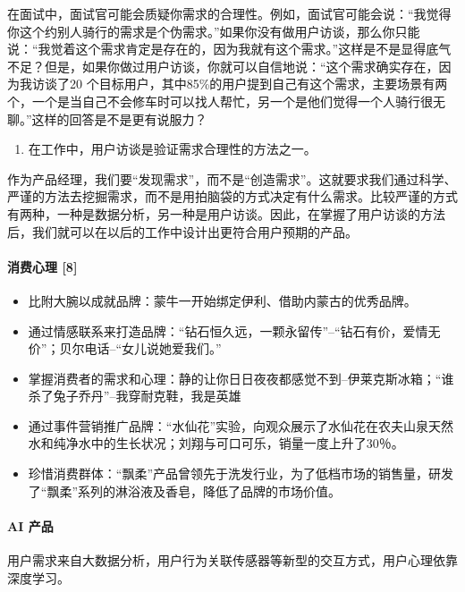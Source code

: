 \documentclass[letterpaper,10pt,english]{sphinxmanual}
\begin{document}
在面试中，面试官可能会质疑你需求的合理性。例如，面试官可能会说：“我觉得你这个约别人骑行的需求是个伪需求。”如果你没有做用户访谈，那么你只能说：“我觉着这个需求肯定是存在的，因为我就有这个需求。”这样是不是显得底气不足？但是，如果你做过用户访谈，你就可以自信地说：“这个需求确实存在，因为我访谈了20
个目标用户，其中85\%的用户提到自己有这个需求，主要场景有两个，一个是当自己不会修车时可以找人帮忙，另一个是他们觉得一个人骑行很无聊。”这样的回答是不是更有说服力？
\begin{enumerate}
%
\setcounter{enumi}{1}
\item {} 
在工作中，用户访谈是验证需求合理性的方法之一。

\end{enumerate}

作为产品经理，我们要“发现需求”，而不是“创造需求”。这就要求我们通过科学、严谨的方法去挖掘需求，而不是用拍脑袋的方式决定有什么需求。比较严谨的方式有两种，一种是数据分析，另一种是用户访谈。因此，在掌握了用户访谈的方法后，我们就可以在以后的工作中设计出更符合用户预期的产品。


\paragraph{消费心理 {[}8{]}}
\label{\detokenize{chapter_knowledge/users_analysis:id36}}\begin{itemize}
\item {} 
比附大腕以成就品牌：蒙牛一开始绑定伊利、借助内蒙古的优秀品牌。

\item {} 
通过情感联系来打造品牌：“钻石恒久远，一颗永留传”–“钻石有价，爱情无价”；贝尔电话–“女儿说她爱我们。”

\item {} 
掌握消费者的需求和心理：静的让你日日夜夜都感觉不到–伊莱克斯冰箱；“谁杀了兔子乔丹”–我穿耐克鞋，我是英雄

\item {} 
通过事件营销推广品牌：“水仙花”实验，向观众展示了水仙花在农夫山泉天然水和纯净水中的生长状况；刘翔与可口可乐，销量一度上升了30％。

\item {} 
珍惜消费群体：“飘柔”产品曾领先于洗发行业，为了低档市场的销售量，研发了“飘柔”系列的淋浴液及香皂，降低了品牌的市场价值。

\end{itemize}


\paragraph{AI 产品}
\label{\detokenize{chapter_knowledge/users_analysis:ai}}
用户需求来自大数据分析，用户行为关联传感器等新型的交互方式，用户心理依靠深度学习。
\end{document}
